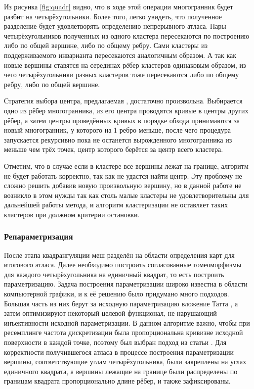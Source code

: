 Из рисунка \ref{fig:quadr} видно, что в ходе этой операции многогранник будет разбит на четырёхугольники. Более того, легко увидеть, что полученное разделение будет удовлетворять определению непрерывного атласа. Пары четырёхугольников полученных из одного кластера пересекаются по построению либо по общей вершине, либо по общему ребру. Сами кластеры из поддерживаемого инварианта пересекаются аналогичным образом. А так как новые вершины ставятся на серединах рёбер кластеров одинаковым образом, из чего четырёхугольники разных кластеров тоже пересекаются либо по общему ребру, либо по общей вершине.

Стратегия выбора центра, предлагаемая \cite{purnomo2004}, достаточно произвольна. Выбирается одно из рёбер многогранника, из его центра проводятся кривые в центры других рёбер, а затем центры проведённых кривых в порядке обхода принимаются за новый многогранник, у которого на 1 ребро меньше, после чего процедура запускается рекурсивно пока не останется вырожденного многогранника из меньше чем трёх точек, центр которого берётся за центр всего кластера.

Отметим, что в случае если в кластере все вершины лежат на границе, алгоритм не будет работать корректно, так как не удастся найти центр. Эту проблему не сложно решить добавив новую произвольную вершину, но в данной работе не возникло в этом нужды так как столь малые кластеры не удовлетворительны для дальнейшей работы метода, и алгоритм кластеризации не оставляет таких кластеров при должном критерии остановки.

\subsubsection{Репараметризация}
После этапа квадрангуляции меш разделён на области определения карт для итогового атласа. Далее необходимо построить согласованные гомеоморфизмы для каждого четырёхугольника на единичный квадрат, то есть построить параметризацию. Задача построения параметризации широко известна в области компьютерной графики, и к её решению было придумано много подходов. Большая часть из них берут за исходную параметризацию вложение Татта \cite{tutte1963}, а затем оптимизируют некоторый целевой функционал, не нарушающий инъективности исходной параметризации. В данном алгоритме важно, чтобы при ресемплинге частота дискретизации была пропорциональна кривизне исходной поверхности в каждой точке, поэтому был выбран подход из статьи \cite{sander2001}. Для корректности получившегося атласа в процессе построения параметризации вершины, соответствующие углам четырёхугольника, были закреплены на углах единичного квадрата, а вершины лежащие на границе были распределены по границам квадрата пропорционально длине рёбер, и также зафиксированы.

